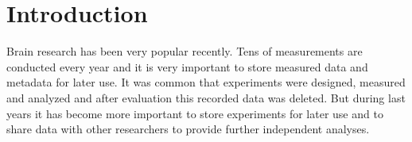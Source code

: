 \documentclass[conference]{IEEEtran}
\begin{document}
%




%
\IEEEpeerreviewmaketitle



\section{Introduction}
Brain research has been very popular recently. Tens of measurements are conducted every year and it is very important to store measured data and metadata for later use. It was common that experiments were designed, measured and analyzed and after evaluation this recorded data was deleted. But during last years it has become more important to store experiments for later use and to share data with other researchers to provide further independent analyses.
\end{document}
